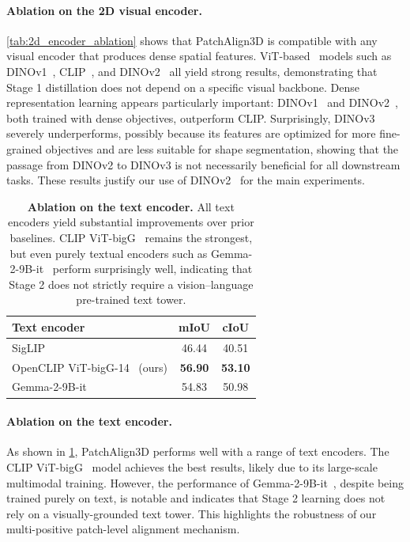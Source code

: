 \paragraph{Ablation on the 2D visual encoder.}
\cref{tab:2d_encoder_ablation} shows that PatchAlign3D is compatible with any
visual encoder that produces dense spatial features. ViT-based~\cite{dosovitskiy2020image} models such as
DINOv1~\cite{caron2021emerging}, CLIP~\cite{radford2021learning}, and DINOv2~\cite{oquab2023dinov2} all yield strong results, demonstrating that Stage 1
distillation does not depend on a specific visual backbone. Dense representation
learning appears particularly important: DINOv1~\cite{caron2021emerging} and DINOv2~\cite{oquab2023dinov2}, both trained with
dense objectives, outperform CLIP. Surprisingly, DINOv3~\cite{simeoni2025dinov3} severely underperforms, possibly
because its features are optimized for more fine-grained objectives and are
less suitable for shape segmentation, showing that the passage from DINOv2 to DINOv3 is not necessarily beneficial for all downstream tasks. These results justify our
use of DINOv2~\cite{oquab2023dinov2} for the main experiments.



\begin{table}[t]
    \centering
    \begin{tabular}{lcc}
        \toprule
        Text encoder & mIoU & cIoU \\
        \midrule
        SigLIP~\cite{zhai2023sigmoid} & 46.44 & 40.51 \\
        OpenCLIP ViT-bigG-14~\cite{radford2021learning} (ours) & \textbf{56.90} & \textbf{53.10} \\
        Gemma-2-9B-it~\cite{team2024gemma}& 54.83 & 50.98 \\
        \bottomrule
    \end{tabular}
    \caption{\textbf{Ablation on the text encoder.}
    All text encoders yield substantial improvements over prior baselines.
    CLIP ViT-bigG~\cite{radford2021learning} remains the strongest, but even purely textual encoders such as
    Gemma-2-9B-it~\cite{team2024gemma} perform surprisingly well, indicating that Stage 2 does not strictly
    require a vision–language pre-trained text tower.}
    \label{tab:text_encoder_ablation}
\end{table}

\paragraph{Ablation on the text encoder.}
As shown in \cref{tab:text_encoder_ablation}, PatchAlign3D performs well with
a range of text encoders. The CLIP ViT-bigG~\cite{radford2021learning} model achieves the best results,
likely due to its large-scale multimodal training. However, the performance of
Gemma-2-9B-it~\cite{team2024gemma}, despite being trained purely on text, is notable and indicates that Stage 2 learning does not rely on a
visually-grounded text tower. This highlights the robustness of our
multi-positive patch-level alignment mechanism.



